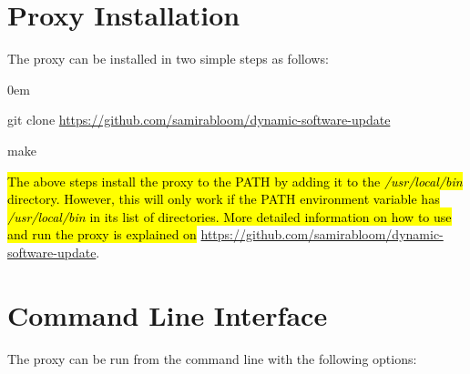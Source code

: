 \documentclass[a4paper,11pt,twoside]{report}
\begin{document}
\section{Proxy Installation}
The proxy can be installed in two simple steps as follows:
\begin{list}{-}{}
  \itemsep0em
  \item git clone \url {https://github.com/samirabloom/dynamic-software-update} 
  \item make
\end{list}

\noindent
\hl{The above steps install the proxy to the PATH by adding it to the \textit{/usr/local/bin} directory. However, this will only work if the PATH environment variable has \textit{/usr/local/bin} in its list of directories. More detailed information on how to use and run the proxy is explained on} \url{https://github.com/samirabloom/dynamic-software-update}. 

\section{Command Line Interface}
The proxy can be run from the command line with the following options:\bigskip
\end{document}
